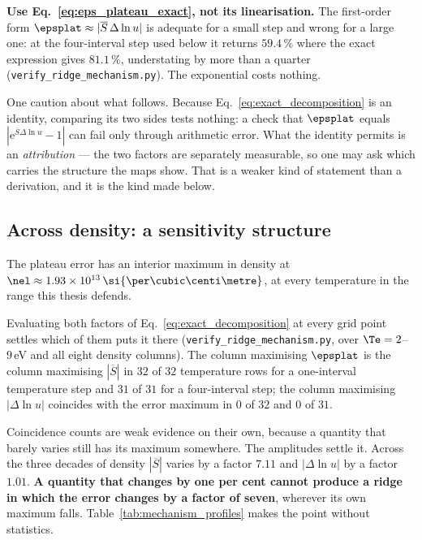 \textbf{Use Eq.~\eqref{eq:eps_plateau_exact}, not its linearisation.} The
first-order form $\epsplat \approx |\overline{S}\,\Delta\ln u|$ is adequate for
a small step and wrong for a large one: at the four-interval step used below it
returns $59.4\,\%$ where the exact expression gives $81.1\,\%$, understating by
more than a quarter (\texttt{verify\_ridge\_mechanism.py}). The exponential
costs nothing.

One caution about what follows. Because Eq.~\eqref{eq:exact_decomposition} is an
identity, comparing its two sides tests nothing: a check that $\epsplat$ equals
$|\mathrm{e}^{\overline{S}\Delta\ln u}-1|$ can fail only through arithmetic
error. What the identity permits is an \emph{attribution} --- the two factors
are separately measurable, so one may ask which carries the structure the maps
show. That is a weaker kind of statement than a derivation, and it is the kind
made below.

\subsection{Across density: a sensitivity structure}
\label{sec:density_mechanism}

The plateau error has an interior maximum in density at
$\nel \approx 1.93\times10^{13}\,\si{\per\cubic\centi\metre}$, at every
temperature in the range this thesis defends.

Evaluating both factors of Eq.~\eqref{eq:exact_decomposition} at every grid
point settles which of them puts it there
(\texttt{verify\_ridge\_mechanism.py}, over $\Te = 2$--$9\,$eV and all eight
density columns). The column maximising $\epsplat$ is the column maximising
$|\overline{S}|$ in $32$ of $32$ temperature rows for a one-interval
temperature step and $31$ of $31$ for a four-interval step; the column
maximising $|\Delta\ln u|$ coincides with the error maximum in $0$ of $32$ and
$0$ of $31$.

Coincidence counts are weak evidence on their own, because a quantity that
barely varies still has its maximum somewhere. The amplitudes settle it. Across
the three decades of density $|\overline{S}|$ varies by a factor $7.11$ and
$|\Delta\ln u|$ by a factor $1.01$. \textbf{A quantity that changes by one per
cent cannot produce a ridge in which the error changes by a factor of seven},
wherever its own maximum falls. Table~\ref{tab:mechanism_profiles} makes the
point without statistics.

